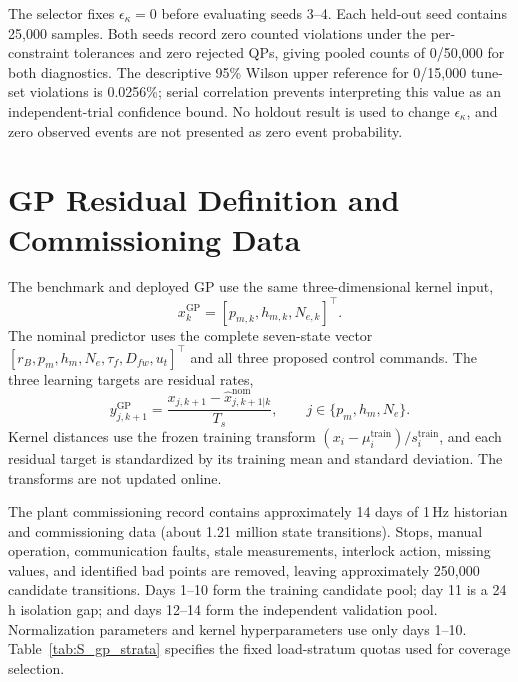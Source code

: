 The selector fixes $\epsilon_\kappa=0$ before evaluating seeds 3--4. Each held-out seed contains 25{,}000 samples. Both seeds record zero counted violations under the per-constraint tolerances and zero rejected QPs, giving pooled counts of 0/50{,}000 for both diagnostics. The descriptive 95\% Wilson upper reference for 0/15{,}000 tune-set violations is 0.0256\%; serial correlation prevents interpreting this value as an independent-trial confidence bound. No holdout result is used to change $\epsilon_\kappa$, and zero observed events are not presented as zero event probability.

\section{GP Residual Definition and Commissioning Data}
\label{sec:supp_gp_data}

The benchmark and deployed GP use the same three-dimensional kernel input,
\begin{equation}
    x_k^{\mathrm{GP}}=[p_{m,k},h_{m,k},N_{e,k}]^\top .
    \label{eq:S_gp_input}
\end{equation}
The nominal predictor uses the complete seven-state vector $[r_B,p_m,h_m,N_e,\tau_f,D_{fw},u_t]^\top$ and all three proposed control commands. The three learning targets are residual rates,
\begin{equation}
    y_{j,k+1}^{\mathrm{GP}}=
    \frac{x_{j,k+1}-\hat{x}^{\mathrm{nom}}_{j,k+1|k}}{T_s},
    \qquad j\in\{p_m,h_m,N_e\}.
    \label{eq:S_gp_target}
\end{equation}
Kernel distances use the frozen training transform $(x_i-\mu_i^{\mathrm{train}})/s_i^{\mathrm{train}}$, and each residual target is standardized by its training mean and standard deviation. The transforms are not updated online.

The plant commissioning record contains approximately 14 days of 1\,Hz historian and commissioning data (about 1.21 million state transitions). Stops, manual operation, communication faults, stale measurements, interlock action, missing values, and identified bad points are removed, leaving approximately 250{,}000 candidate transitions. Days 1--10 form the training candidate pool; day 11 is a 24\,h isolation gap; and days 12--14 form the independent validation pool. Normalization parameters and kernel hyperparameters use only days 1--10. Table~\ref{tab:S_gp_strata} specifies the fixed load-stratum quotas used for coverage selection.


